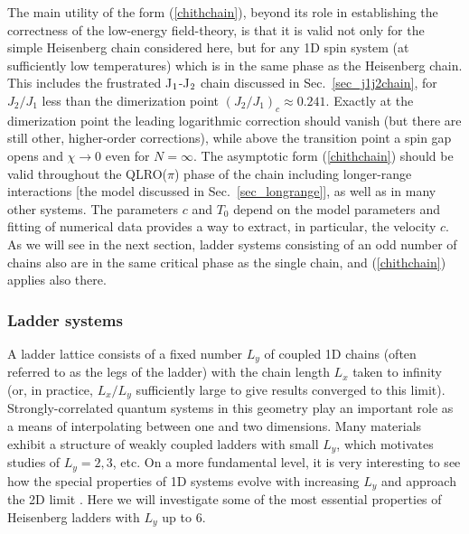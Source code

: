 \documentclass[draft,numberedheadings]{aipproc}
\begin{document}
The main utility of the form (\ref{chithchain}), beyond its role in establishing the correctness of the low-energy field-theory, is that it is valid 
not only for the simple Heisenberg chain considered here, but for any 1D spin system (at sufficiently low temperatures) which is in the same phase as the 
Heisenberg chain. This includes the frustrated J$_{\rm 1}$-J$_{\rm 2}$ chain discussed in Sec.~\ref{sec_j1j2chain}, for $J_2/J_1$ less than the dimerization 
point $(J_2/J_1)_c \approx 0.241$. Exactly at the dimerization point the leading logarithmic correction should vanish \cite{eggert96b} (but there are still 
other, higher-order corrections), while above the transition point a spin gap opens and $\chi \to 0$ even for $N=\infty$. The asymptotic form (\ref{chithchain})
should be valid throughout the QLRO($\pi$) phase of the chain including longer-range interactions [the model discussed in Sec.~\ref{sec_longrange}], as well as 
in many other systems. The parameters $c$ and $T_0$ depend on the model parameters and fitting of numerical data provides a way to extract, in particular, the 
velocity $c$. As we will see in the next section, ladder systems consisting of an odd number of chains also are in the same critical phase as the single chain, 
and (\ref{chithchain}) applies also there.

\subsubsection{Ladder systems}
\label{sec_ladders}

A ladder lattice consists of a fixed number $L_y$ of coupled 1D chains (often referred to as the legs of the ladder) with the chain length $L_x$ taken to 
infinity (or, in practice, $L_x/L_y$ sufficiently large to give results converged to this limit). 
Strongly-correlated quantum systems in this geometry \cite{dagotto1,dagotto92,sheng09} play an important role as a means of 
interpolating between one and two dimensions. Many materials exhibit a structure of weakly coupled ladders with small $L_y$, which motivates studies of 
$L_y=2,3$, etc. On a more fundamental level, it is very interesting to see how the special properties of 1D systems evolve with increasing $L_y$ and approach 
the 2D limit \cite{frischmuth96}. Here we will investigate some of the most essential properties of Heisenberg ladders with $L_y$ up to $6$. 
\end{document}
